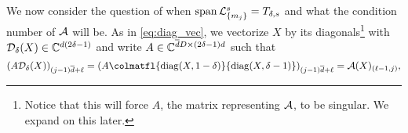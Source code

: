 We now consider the question of when $\operatorname{span} \mathcal{L}_{\{m_j\}}^s = T_{\delta, s}$ and what the condition number of $\mathcal{A}$ will be.  As in \eqref{eq:diag_vec}, we vectorize $X$ by its diagonals\footnote{Notice that this will force $A$, the matrix representing $\mathcal{A}$, to be singular.  We expand on this later.} with $\mathcal{D}_\delta(X) \in \mathbb{C}^{d (2 \delta - 1)}$ and write $A \in \mathbb{C}^{\overline{d} D \times (2 \delta - 1) d}$ such that \begin{equation*} \left(A \Dc_\delta(X) \right)_{(j-1) \dbar + \ell} =  \left(A \colmatfl{\diag(X, 1 - \delta)}{\diag(X, \delta - 1)}\right)_{(j - 1) \dbar + \ell} = \Ac(X)_{(\ell - 1, j)}, %
\end{equation*}

